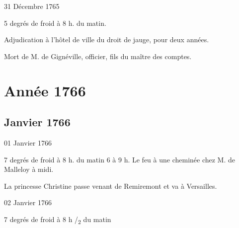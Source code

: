                      \begin{diary}{31 Décembre 1765}{}


                           5 degrés de froid à 8 h. du matin. \bigskip


                         Adjudication à l'hôtel de ville du droit
                           de jauge, pour deux
                           années. \bigskip


                         Mort de M.
                              de Gignéville, officier,
                           fils du maître des comptes. \bigskip



                     \end{diary}

               \part*{Année 1766}\chapter*{Janvier 1766}



                     \begin{diary}{01 Janvier 1766}{}


                           7 degrés de froid à 8 h. du matin
                           6 à 9 h.
                           Le feu à une cheminée
                           chez
                           M. de Malleloy
                           à midi. \bigskip



                           La princesse Christine passe
                           venant
                           de Remiremont et va à
                              Versailles. \bigskip


                     \end{diary}

                     \begin{diary}{02 Janvier 1766}{}


                           7 degrés de froid à 8 h /\textsubscript{2} du matin
                        \bigskip


                     \end{diary}

